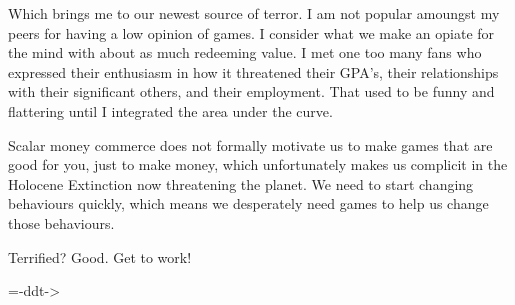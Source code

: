 \par
Which brings me to our newest source of terror.  I am not popular amoungst my peers for having a low opinion of games.  I consider what we make an opiate for the mind with about as much redeeming value.  I met one too many \doom{} fans who expressed their enthusiasm in how it threatened their GPA's, their relationships with their significant others, and their employment.  That used to be funny and flattering until I integrated the area under the curve.\\
\par
Scalar money commerce does not formally motivate us to make games that are good for you, just to make money, which unfortunately makes us complicit in the Holocene Extinction now threatening the planet.  We need to start changing behaviours quickly, which means we desperately need games to help us change those behaviours.\\
\par
Terrified?  Good.  Get to work!\\
\par
        =-ddt->\\
\par

